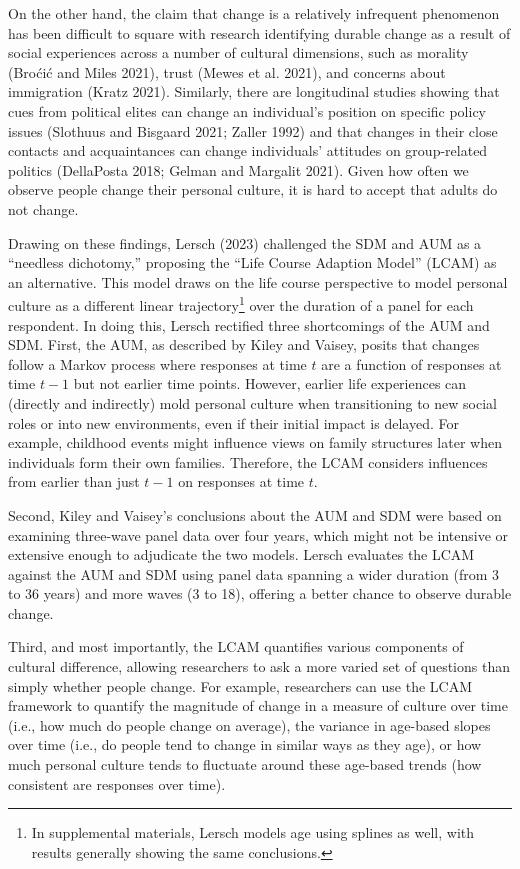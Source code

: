 \documentclass[
  12pt,
]{article}
\begin{document}
On the other hand, the claim that change is a relatively infrequent
phenomenon has been difficult to square with research identifying
durable change as a result of social experiences across a number of
cultural dimensions, such as morality (Broćić and Miles 2021), trust
(Mewes et al. 2021), and concerns about immigration (Kratz 2021).
Similarly, there are longitudinal studies showing that cues from
political elites can change an individual's position on specific policy
issues (Slothuus and Bisgaard 2021; Zaller 1992) and that changes in
their close contacts and acquaintances can change individuals' attitudes
on group-related politics (DellaPosta 2018; Gelman and Margalit 2021).
Given how often we observe people change their personal culture, it is
hard to accept that adults do not change.

Drawing on these findings, Lersch (2023) challenged the SDM and AUM as a
``needless dichotomy,'' proposing the ``Life Course Adaption Model''
(LCAM) as an alternative. This model draws on the life course
perspective to model personal culture as a different linear
trajectory\footnote{In supplemental materials, Lersch models age using
  splines as well, with results generally showing the same conclusions.}
over the duration of a panel for each respondent. In doing this, Lersch
rectified three shortcomings of the AUM and SDM. First, the AUM, as
described by Kiley and Vaisey, posits that changes follow a Markov
process where responses at time \(t\) are a function of responses at
time \(t-1\) but not earlier time points. However, earlier life
experiences can (directly and indirectly) mold personal culture when
transitioning to new social roles or into new environments, even if
their initial impact is delayed. For example, childhood events might
influence views on family structures later when individuals form their
own families. Therefore, the LCAM considers influences from earlier than
just \(t-1\) on responses at time \(t\).

Second, Kiley and Vaisey's conclusions about the AUM and SDM were based
on examining three-wave panel data over four years, which might not be
intensive or extensive enough to adjudicate the two models. Lersch
evaluates the LCAM against the AUM and SDM using panel data spanning a
wider duration (from 3 to 36 years) and more waves (3 to 18), offering a
better chance to observe durable change.

Third, and most importantly, the LCAM quantifies various components of
cultural difference, allowing researchers to ask a more varied set of
questions than simply whether people change. For example, researchers
can use the LCAM framework to quantify the magnitude of change in a
measure of culture over time (i.e., how much do people change on
average), the variance in age-based slopes over time (i.e., do people
tend to change in similar ways as they age), or how much personal
culture tends to fluctuate around these age-based trends (how consistent
are responses over time).
\end{document}
